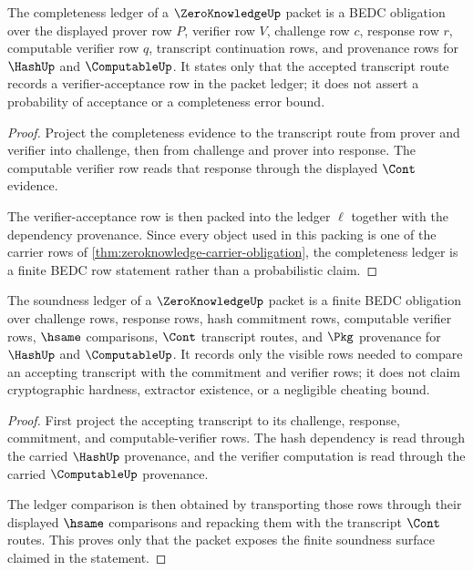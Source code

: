 \begin{theorem}
\label{thm:zeroknowledge-completeness-ledger-obligation}
The completeness ledger of a $\ZeroKnowledgeUp$ packet is a BEDC obligation over the displayed prover row $P$, verifier row $V$, challenge row $c$, response row $r$, computable verifier row $q$, transcript continuation rows, and provenance rows for $\HashUp$ and $\ComputableUp$. It states only that the accepted transcript route records a verifier-acceptance row in the packet ledger; it does not assert a probability of acceptance or a completeness error bound.
\end{theorem}
\begin{proof}
Project the completeness evidence to the transcript route from prover and verifier into challenge, then from challenge and prover into response. The computable verifier row reads that response through the displayed $\Cont$ evidence.

The verifier-acceptance row is then packed into the ledger $\ell$ together with the dependency provenance. Since every object used in this packing is one of the carrier rows of \autoref{thm:zeroknowledge-carrier-obligation}, the completeness ledger is a finite BEDC row statement rather than a probabilistic claim.
\end{proof}

\begin{theorem}
\label{thm:zeroknowledge-soundness-ledger-obligation}
The soundness ledger of a $\ZeroKnowledgeUp$ packet is a finite BEDC obligation over challenge rows, response rows, hash commitment rows, computable verifier rows, $\hsame$ comparisons, $\Cont$ transcript routes, and $\Pkg$ provenance for $\HashUp$ and $\ComputableUp$. It records only the visible rows needed to compare an accepting transcript with the commitment and verifier rows; it does not claim cryptographic hardness, extractor existence, or a negligible cheating bound.
\end{theorem}
\begin{proof}
First project the accepting transcript to its challenge, response, commitment, and computable-verifier rows. The hash dependency is read through the carried $\HashUp$ provenance, and the verifier computation is read through the carried $\ComputableUp$ provenance.

The ledger comparison is then obtained by transporting those rows through their displayed $\hsame$ comparisons and repacking them with the transcript $\Cont$ routes. This proves only that the packet exposes the finite soundness surface claimed in the statement.
\end{proof}

